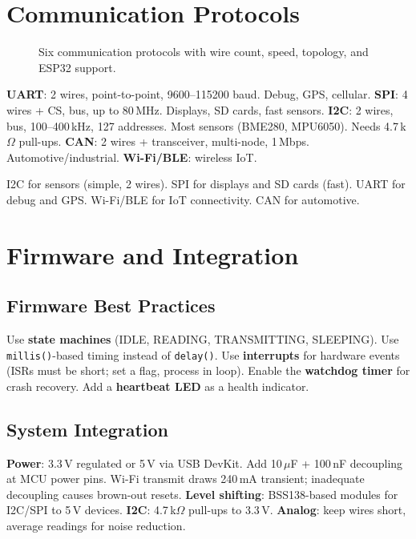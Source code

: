 \section{Communication Protocols}
\begin{figure}[htbp]\centering
\caption{Six communication protocols with wire count, speed, topology, and ESP32 support.}\end{figure}

\textbf{UART}: 2 wires, point-to-point, 9600--115200 baud. Debug, GPS, cellular. \textbf{SPI}: 4 wires + CS, bus, up to 80\,MHz. Displays, SD cards, fast sensors. \textbf{I2C}: 2 wires, bus, 100--400\,kHz, 127 addresses. Most sensors (BME280, MPU6050). Needs 4.7\,k$\Omega$ pull-ups. \textbf{CAN}: 2 wires + transceiver, multi-node, 1\,Mbps. Automotive/industrial. \textbf{Wi-Fi/BLE}: wireless IoT.

\begin{tipbox}
I2C for sensors (simple, 2 wires). SPI for displays and SD cards (fast). UART for debug and GPS. Wi-Fi/BLE for IoT connectivity. CAN for automotive.
\end{tipbox}

\section{Firmware and Integration}
\subsection{Firmware Best Practices}
Use \textbf{state machines} (IDLE, READING, TRANSMITTING, SLEEPING). Use \texttt{millis()}-based timing instead of \texttt{delay()}. Use \textbf{interrupts} for hardware events (ISRs must be short; set a flag, process in loop). Enable the \textbf{watchdog timer} for crash recovery. Add a \textbf{heartbeat LED} as a health indicator.

\subsection{System Integration}
\textbf{Power}: 3.3\,V regulated or 5\,V via USB DevKit. Add 10\,$\mu$F + 100\,nF decoupling at MCU power pins. Wi-Fi transmit draws 240\,mA transient; inadequate decoupling causes brown-out resets. \textbf{Level shifting}: BSS138-based modules for I2C/SPI to 5\,V devices. \textbf{I2C}: 4.7\,k$\Omega$ pull-ups to 3.3\,V. \textbf{Analog}: keep wires short, average readings for noise reduction.

